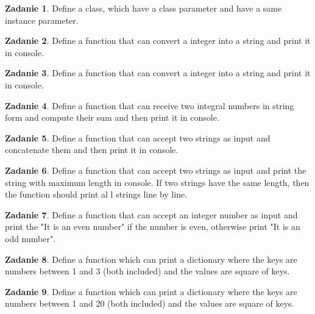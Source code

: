 \documentclass[11pt]{article}
\theoremstyle{definition}
\newtheorem{zadanie}{Zadanie}
\begin{document}
\begin{zadanie}
Define a class, which have a class parameter and have a same instance parameter.

\end{zadanie}

\begin{zadanie}
Define a function that can convert a integer into a string and print it in console.

\end{zadanie}

\begin{zadanie}
Define a function that can convert a integer into a string and print it in console.

\end{zadanie}

\begin{zadanie}
Define a function that can receive two integral numbers in string form and compute their sum and then print it in console.

\end{zadanie}

\begin{zadanie}
Define a function that can accept two strings as input and concatenate them and then print it in console.

\end{zadanie}

\begin{zadanie}
Define a function that can accept two strings as input and print the string with maximum length in console. If two strings have the same length, then the function should print al l strings line by line.

\end{zadanie}

\begin{zadanie}
Define a function that can accept an integer number as input and print the "It is an even number" if the number is even, otherwise print "It is an odd number".

\end{zadanie}

\begin{zadanie}
Define a function which can print a dictionary where the keys are numbers between 1 and 3 (both included) and the values are square of keys.

\end{zadanie}

\begin{zadanie}
Define a function which can print a dictionary where the keys are numbers between 1 and 20 (both included) and the values are square of keys.

\end{zadanie}
\end{document}
